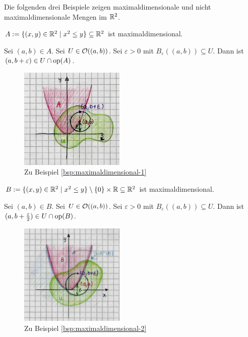 %
%
    Die folgenden drei Beispiele zeigen maximaldimensionale und nicht maximaldimensionale Mengen im $\mathbb{R}^2$.
%
    \begin{bsp}\label{bsp:maximaldimensional-1}
        $A := \{(x,y) \in \mathbb{R}^2 \mid x^2 \leq y\} \subseteq \mathbb{R}^2$ ist maximaldimensional.
    \end{bsp}
%
    \begin{bew}
        Sei $(a,b) \in A$. Sei $U \in \mathcal{O}((a,b))$. Sei $\varepsilon > 0$ mit $B_\varepsilon((a,b)) \subseteq U$. Dann ist $(a,b+\varepsilon) \in U \cap \text{op}(A)$.
    \end{bew}
%
%    
    \begin{figure}[ht]
        \centering
        \includegraphics[width=5cm]{abb/maxdim-1.png}
        \caption{Zu Beispiel \ref{bsp:maximaldimensional-1}}
        \label{fig:maxdim-1}
    \end{figure}
%
    \begin{bsp}\label{bsp:maximaldimensional-2}
        $B := \{(x,y) \in \mathbb{R}^2 \mid x^2 \leq y\} \setminus \{0\} \times \mathbb{R} \subseteq \mathbb{R}^2$ ist maximaldimensional.
    \end{bsp}
%
    \begin{bew}
        Sei $(a,b) \in B$. Sei $U \in \mathcal{O}((a,b))$. Sei $\varepsilon > 0$ mit $B_\varepsilon((a,b)) \subseteq U$. Dann ist $(a,b+\frac{\varepsilon}{2}) \in U \cap \text{op}(B)$.
    \end{bew}
%
%    
    \begin{figure}[ht]
        \centering
        \includegraphics[width=5cm]{abb/maxdim-2.png}
        \caption{Zu Beispiel \ref{bsp:maximaldimensional-2}}
        \label{fig:maxdim-2}
    \end{figure}
